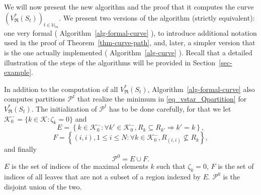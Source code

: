 \documentclass[
  11pt,
  a4paper,
]{article}
\theoremstyle{definition}
\theoremstyle{plain}
\theoremstyle{plain}
\theoremstyle{plain}
\theoremstyle{definition}
\theoremstyle{remark}
\begin{document}
We will now present the new algorithm and the proof that it computes the
curve \((V^*_{\mathfrak{R}}(S_t))_{t\in\mathbb{N}_m}\). We present two
versions of the algorithm (strictly equivalent): one very formal
( Algorithm~\ref{alg-formal-curve} ), to introduce additional notation
used in the proof of Theorem~\ref{thm-curve-path}, and, later, a simpler
version that is the one actually implemented
( Algorithm~\ref{alg-curve} ). Recall that a detailed illustration of
the steps of the algorithms will be provided in
Section~\ref{sec-example}.

In addition to the computation of all \(V^*_{\mathfrak{R}}(S_t)\),
 Algorithm~\ref{alg-formal-curve}  also computes partitions
\(\mathcal{P}^t\) that realize the minimum in
\eqref{eq_vstar_Qpartition} for \(V^*_{\mathfrak{R}}(S_t)\). The
initialization of \(\mathcal{P}^t\) has to be done carefully, for that
we let \(\mathcal{K}_0^-=\{k\in\mathcal{K}: \zeta_k=0  \}\) and
\begin{equation}
E=\left\{k\in\mathcal{K}_0^-:\forall k'\in \mathcal{K}_0^-, R_k\subseteq R_{k'}\Rightarrow k'=k \right\},
\label{E}
\end{equation} \begin{equation}
F=\left\{(i,i), 1\leq i\leq N:\forall k\in \mathcal{K}_0^-, R_{(i,i)}\not\subseteq R_k  \right\},
\label{F}
\end{equation} and finally \begin{equation}
\mathcal{P}^0=E\cup F.
\label{cP0}
\end{equation} \(E\) is the set of indices of the maximal elements \(k\)
such that \(\zeta_k=0\), \(F\) is the set of indices of all leaves that
are not a subset of a region indexed by \(E\). \(\mathcal{P}^0\) is the
disjoint union of the two.
\end{document}
